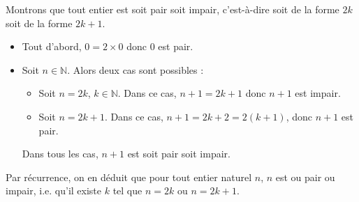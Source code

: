 \begin{expl}
    Montrons que tout entier est soit pair soit impair, c'est-à-dire soit de la forme $2k$ soit de la forme $2k+1$.
    \begin{itemize}[label=$\bullet$]
        \item Tout d'abord, $0=2\times 0$ donc $0$ est pair.
        \item Soit $n\in\mathbb N$. Alors deux cas sont possibles :
        \begin{itemize}
            \item Soit $n=2k$, $k\in \mathbb N$. Dans ce cas, $n+1=2k+1$ donc $n+1$ est impair.
            \item Soit $n=2k+1$. Dans ce cas, $n+1=2k+2=2(k+1)$, donc $n+1$ est pair.
        \end{itemize}
        Dans tous les cas, $n+1$ est soit pair soit impair.
    \end{itemize}
    Par récurrence, on en déduit que pour tout entier naturel $n$, $n$ est ou pair ou impair, i.e. qu'il existe $k$ tel que $n=2k$ ou $n=2k+1$.
\end{expl}

\newpage